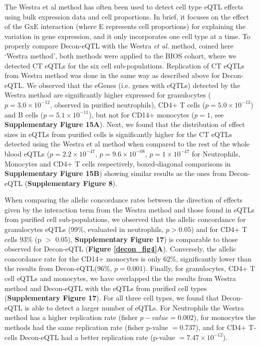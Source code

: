 The Westra et al method has often been used to detect cell type eQTL effects using bulk expression data and cell proportions\cite{davenportDiscoveringVivoCytokineeQTL2018,wilsonMappingTumorSpecificExpression2019,geeleherCancerExpressionQuantitative2018,glastonburyCellTypeHeterogeneityAdipose2019}. In brief, it focuses on the effect of the GxE interaction (where E represents cell proportions) for explaining the variation in gene expression, and it only incorporates one cell type at a time. To properly compare Decon-eQTL with the Westra \emph{et al.} method\cite{westraCellSpecificEQTL2015}, coined here ‘Westra method’, both methods were applied to the BIOS cohort, where we detected CT eQTLs for the six cell sub-populations. Replication of CT eQTLs from Westra method was done in the same way as described above for Decon-eQTL. We observed that the eGenes (i.e. genes with eQTLs) detected by the Westra method are significantly higher expressed for granulocytes ($p = 3.0 \times 10^{-12}$, observed in purified neutrophils), CD4+ T cells ($p = 5.0 \times 10^{-13}$) and B cells ($p = 5.1 \times 10^{-11}$), but not for CD14+ monocytes ($p = 1$, see \textbf{Supplementary Figure 15A}). Next, we found that the distribution of effect sizes in eQTLs from purified cells is significantly higher for the CT eQTLs detected using the Westra et al method when compared to the rest of the whole blood eQTLs ($p = 2.2 \times 10^{-47}$, $p = 9.6 \times 10^{-08}$, $p = 1 \times 10^{-47}$ for Neutrophils, Monocytes and CD4+ T cells respectively, boxed-diagonal comparisons in \textbf{Supplementary Figure 15B}) showing similar results as the ones from Decon-eQTL (\textbf{Supplementary Figure 8}).

When comparing the allelic concordance rates between the direction of effects given by the interaction term from the Westra method and those found in eQTLs from purified cell sub-populations, we observed that the allelic concordance for granulocytes eQTLs (99\%, evaluated in neutrophils, $p > 0.05$) and for CD4+ T cells 93\% (p $>$ 0.05), \textbf{Supplementary Figure 17}) is comparable to those observed for Decon-eQTL (\textbf{Figure \ref{decon_fig4}A}). Conversely, the allelic concordance rate for the CD14+ monocytes is only 62\%, significantly lower than the results from Decon-eQTL(96\%, $p = 0.001$). Finally, for granulocytes, CD4+ T cell eQTLs and monocytes, we have overlapped the the results from Westra method and Decon-eQTL with the eQTLs from purified cell types\cite{chenGeneticDriversEpigenetic2016} (\textbf{Supplementary Figure 17}). For all three cell types, we found that Decon-eQTL is able to detect a larger number of eQTLs. For Neutrophils the Westra method has a higher replication rate (fisher $p-value = 0.002$), for monocytes the methods had the same replication rate (fisher p-value $= 0.737$), and for CD4+ T-cells Decon-eQTL had a better replication rate (p-value $= 7.47 \times 10^{-12}$). 

